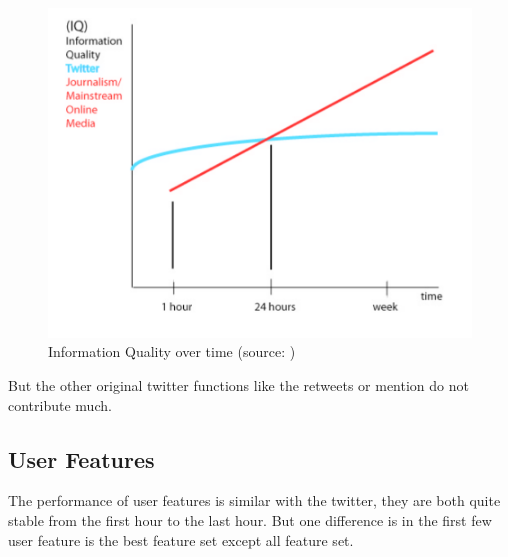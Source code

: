   \begin{figure}[!h]
\centering
\includegraphics[width=0.7\columnwidth]{images/Informationqulitat.png}
\caption{Information Quality over time (source: \cite{mills2009web})}
\label{fig:allfeature}
\end{figure}

 But the other original twitter functions like the retweets or mention do not contribute much.
 

\begin{table}[!h]
\centering
{}
\caption{Rank of Part of Twitter Feature}
\label{twitterfeaturerank}
\end{table}

\subsection{User Features} 
The performance of user features is similar with the twitter, they are both quite stable from the first hour to the last hour. But one difference is in the first few user feature is the best feature set except all feature set.

